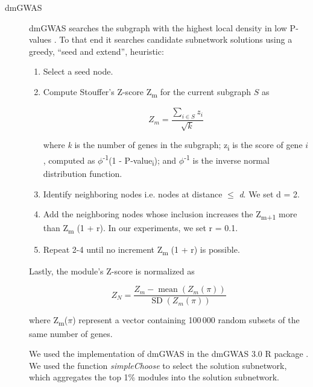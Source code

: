 \documentclass[twocolumn, 10pt]{article}
\begin{document}
\begin{description}
\item[{dmGWAS}] dmGWAS searches the subgraph with the highest local density in low P-values \cite{jia_dmgwas:_2011}. To that end it searches candidate subnetwork solutions using a greedy, ``seed and extend'', heuristic:

\begin{enumerate}
\item Select a seed node.
\item Compute Stouffer's Z-score Z\textsubscript{m} for the current subgraph $S$ as

\begin{equation*} 
Z_m = \frac{\sum_{i \in S} z_i}{\sqrt{k}}
\end{equation*}

where \emph{k} is the number of genes in the subgraph; z\textsubscript{i} is the score of gene $i$, computed as \(\phi\)\textsuperscript{-1}(1 - P-value\textsubscript{i}); and \(\phi\)\textsuperscript{-1} is the inverse normal distribution function.
\item Identify neighboring nodes i.e. nodes at distance \(\le\) \emph{d}. We set d = 2.
\item Add the neighboring nodes whose inclusion increases the Z\textsubscript{m+1} more than Z\textsubscript{m} \texttimes{} (1 + r). In our experiments, we set r = 0.1.
\item Repeat 2-4 until no increment Z\textsubscript{m} \texttimes{} (1 + r) is possible.
\end{enumerate}

Lastly, the module's Z-score is normalized as

\begin{equation*}
Z_{N}=\frac{Z_{m}-\operatorname{mean}\left(Z_{m}(\pi)\right)}{\operatorname{SD}\left(Z_{m}(\pi)\right)}
\end{equation*} 

where Z\textsubscript{m}(\(\pi\)) represent a vector containing 100\,000 random subsets of the same number of genes.

We used the implementation of dmGWAS in the dmGWAS 3.0 R package \cite{dmgwas}. We used the function \emph{simpleChoose} to select the solution subnetwork, which aggregates the top 1\% modules into the solution subnetwork.
\end{description}
\end{document}
